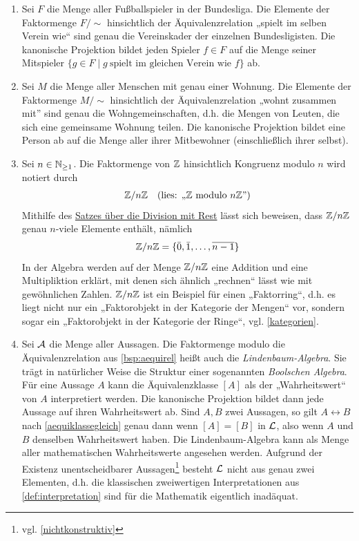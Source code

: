 \begin{bsp} \label{bsp:faktormenge} \quad
    \begin{enumerate}
        \item Sei $F$ die Menge aller Fußballspieler in der Bundesliga. Die Elemente der Faktormenge $F/{\sim}$ hinsichtlich der Äquivalenzrelation „spielt im selben Verein wie“ sind genau die Vereinskader der einzelnen Bundesligisten. Die kanonische Projektion bildet jeden Spieler $f\in F$ auf die Menge seiner Mitspieler $\{g\in F\mid g\ \text{spielt im gleichen Verein wie $f$}\}$ ab.
        \item Sei $M$ die Menge aller Menschen mit genau einer Wohnung. Die Elemente der Faktormenge $M/{\sim}$ hinsichtlich der Äquivalenzrelation „wohnt zusammen mit” sind genau die Wohngemeinschaften, d.h. die Mengen von Leuten, die sich eine gemeinsame Wohnung teilen. Die kanonische Projektion bildet eine Person ab auf die Menge aller ihrer Mitbewohner (einschließlich ihrer selbst).
        \item Sei $n\in \mathbb N_{\ge 1}$. Die Faktormenge von $\mathbb Z$ hinsichtlich Kongruenz modulo $n$ wird notiert durch
        \begin{align*}
            \mathbb Z/n\mathbb Z && (\text{lies: „$\mathbb Z$ modulo $n\mathbb Z$”})
        \end{align*}
        Mithilfe des \href{https://de.wikipedia.org/wiki/Division_mit_Rest}{Satzes über die Division mit Rest} lässt sich beweisen, dass $\mathbb Z/n\mathbb Z$ genau $n$-viele Elemente enthält, nämlich
        \[ \mathbb Z/n\mathbb Z = \{\bar 0,\bar 1,\dots , \overline{n-1} \} \]
        In der Algebra werden auf der Menge $\mathbb Z/n\mathbb Z$ eine Addition und eine Multipliktion erklärt, mit denen sich ähnlich „rechnen“ lässt wie mit gewöhnlichen Zahlen. $\mathbb Z/n\mathbb Z$ ist ein Beispiel für einen „Faktorring“, d.h. es liegt nicht nur ein „Faktorobjekt in der Kategorie der Mengen“ vor, sondern sogar ein „Faktorobjekt in der Kategorie der Ringe“, vgl. \cref{kategorien}.
        \item Sei $\mathcal A$ die Menge aller Aussagen. Die Faktormenge modulo die Äquivalenzrelation aus \cref{bsp:aequirel} heißt auch die \emph{Lindenbaum-Algebra}. Sie trägt in natürlicher Weise die Struktur einer sogenannten \emph{Boolschen Algebra}. Für eine Aussage $A$ kann die Äquivalenzklasse $[A]$ als der „Wahrheitswert“ von $A$ interpretiert werden. Die kanonische Projektion bildet dann jede Aussage auf ihren Wahrheitswert ab. Sind $A,B$ zwei Aussagen, so gilt $A\leftrightarrow B$ nach \cref{aequiklassegleich} genau dann wenn $[A]=[B]$ in $\mathcal L$, also wenn $A$ und $B$ denselben Wahrheitswert haben. Die Lindenbaum-Algebra kann als Menge aller mathematischen Wahrheitswerte angesehen werden. Aufgrund der Existenz unentscheidbarer Aussagen\footnote{vgl. \cref{nichtkonstruktiv}} besteht $\mathcal L$ nicht aus genau zwei Elementen, d.h. die klassischen zweiwertigen Interpretationen aus \cref{def:interpretation} sind für die Mathematik eigentlich inadäquat.
    \end{enumerate}
\end{bsp}


